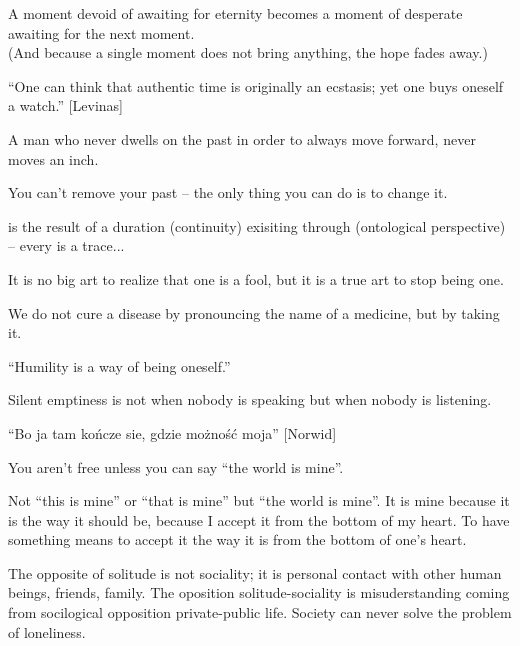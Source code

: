 \pa
A moment devoid of awaiting for eternity becomes a moment of desperate awaiting for
the next moment. \\
(And because a single moment does not bring anything, the hope fades away.)

\pa
``One can think that authentic time is originally an ecstasis; yet one buys
oneself a watch.'' [Levinas]

\pa
A man who never dwells on the past in order to always move forward, never
moves an inch.

\pa
You can't remove your past -- the only thing you can do is to change it.

\pa
{} is the result of a duration (continuity) exisiting through
 (ontological perspective) -- every  is a trace...

\pa
It is no big art to realize that one is a fool, but it is a true art 
to stop being one. 

We do not cure a disease by pronouncing the name of a medicine, but by 
taking it.



\pa
``Humility is a way of being oneself.''

\pa
Silent emptiness is not when nobody is speaking but when nobody is 
listening.

\pa
``Bo ja tam ko\'ncze\; sie\;, gdzie mo\.zno\'s\'c moja'' [Norwid]


\pa
You aren't free unless you can say ``the world is mine''.

Not ``this is mine'' or ``that is mine'' but ``the world is mine''. It
is mine because it is the way it should be, because I accept it from
the bottom of my heart. To have something means to accept it the way
it is from the bottom of one's heart.

\pa
The opposite of solitude is not sociality; it is personal contact with
other human beings, friends, family. The oposition solitude-sociality is
misuderstanding coming from socilogical opposition private-public life.
Society can never solve the problem of loneliness.




